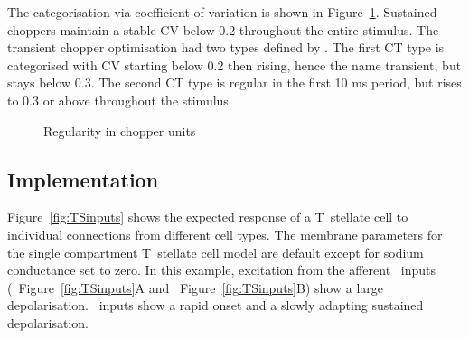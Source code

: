 

The categorisation via coefficient of variation is shown in Figure~\ref{fig:PaoliniCVdata}.
Sustained choppers maintain a stable CV below 0.2 throughout the entire stimulus. The transient chopper optimisation had two types defined by \citep{PaoliniClareyEtAl:2005}.
The first CT type is categorised with CV starting below 0.2 then rising, hence the name transient, but stays below 0.3.
The second CT type is regular in the first 10 ms period, but rises to 0.3 or above throughout the stimulus.

\begin{figure}[htb]
  \centering
  \caption{Regularity in chopper units \citep[Data reproduced from Fig.~2,~][]{PaoliniClareyEtAl:2005}}
  \label{fig:PaoliniCVdata}
\end{figure}





\subsection{Implementation}






Figure~\ref{fig:TSinputs} shows the expected response of a T~stellate cell to individual connections from different cell types.
The membrane parameters for the single compartment T~stellate cell model are default except for sodium conductance set to zero.
In this example, excitation from the afferent \ANF~inputs (\LSR~Figure~\ref{fig:TSinputs}A and \HSR~Figure~\ref{fig:TSinputs}B) show a large depolarisation.
\HSR~inputs show a rapid onset and a slowly adapting sustained depolarisation.





